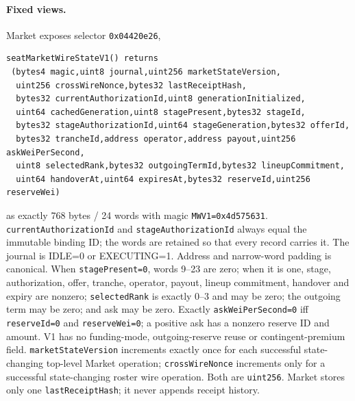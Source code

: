 \documentclass[a4paper,11pt]{article}
\newcommand{\code}[1]{\nolinkurl{#1}}
\begin{document}
\paragraph{Fixed views.}
Market exposes selector \code{0x04420e26},
\begin{verbatim}
seatMarketWireStateV1() returns
 (bytes4 magic,uint8 journal,uint256 marketStateVersion,
  uint256 crossWireNonce,bytes32 lastReceiptHash,
  bytes32 currentAuthorizationId,uint8 generationInitialized,
  uint64 cachedGeneration,uint8 stagePresent,bytes32 stageId,
  bytes32 stageAuthorizationId,uint64 stageGeneration,bytes32 offerId,
  bytes32 trancheId,address operator,address payout,uint256 askWeiPerSecond,
  uint8 selectedRank,bytes32 outgoingTermId,bytes32 lineupCommitment,
  uint64 handoverAt,uint64 expiresAt,bytes32 reserveId,uint256 reserveWei)
\end{verbatim}
as exactly 768 bytes / 24 words with magic \code{MWV1=0x4d575631}.
\code{currentAuthorizationId} and \code{stageAuthorizationId} always equal the
immutable binding ID; the words are retained so that every record carries it.
The journal is IDLE=0 or EXECUTING=1.  Address and narrow-word padding is
canonical.  When \code{stagePresent=0}, words 9--23 are zero; when it is one,
stage, authorization, offer, tranche, operator, payout, lineup commitment,
handover and expiry are nonzero; \code{selectedRank} is exactly 0--3 and may be
zero; the outgoing term may be zero; and ask may be zero.  Exactly
\code{askWeiPerSecond=0} iff \code{reserveId=0} and \code{reserveWei=0}; a
positive ask has a nonzero reserve ID and amount.  V1 has no funding-mode,
outgoing-reserve reuse or contingent-premium field.
\code{marketStateVersion} increments exactly once for
each successful state-changing top-level Market operation;
\code{crossWireNonce} increments only for a successful state-changing roster
wire operation.  Both are \code{uint256}.  Market stores only one
\code{lastReceiptHash}; it never appends receipt history.
\end{document}
